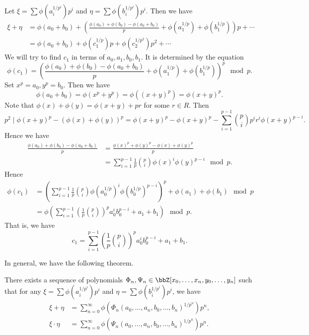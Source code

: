 \begin{example}
	Let $\xi = \sum \phi(a_i^{1/p^i})p^i$ and $\eta = \sum \phi(b_i^{1/p^i})p^i$.
	Then we have
	\begin{align*}
		\xi + \eta & = \phi(a_0 + b_0) + \left( \frac{\phi(a_0) + \phi(b_0) - \phi(a_0 + b_0)}{p} + \phi(a_1^{1/p}) + \phi(b_1^{1/p}) \right)p + \cdots \\
		           & = \phi(a_0 + b_0) + \phi(c_1^{1/p}) p + \phi(c_2^{1/p^2}) p^2 + \cdots
	\end{align*}
	We will try to find $c_1$ in terms of $a_0, a_1, b_0, b_1$.
	It is determined by the equation
	\[ \phi(c_1) = \left( \frac{\phi(a_0) + \phi(b_0) - \phi(a_0 + b_0)}{p} + \phi(a_1^{1/p}) + \phi(b_1^{1/p}) \right)^p \mod p. \]
	Set $x^p = a_0, y^p = b_0$.
	Then we have
	\[ \phi(a_0+b_0) = \phi(x^p + y^p) = \phi((x+y)^p) = \phi(x+y)^p. \]
	Note that $\phi(x) +\phi(y) = \phi(x + y) + p r$ for some $r \in R$.
	Then
	\[ p^2 \mid \phi(x+y)^p - (\phi(x) + \phi(y))^p = \phi(x+y)^p - \phi(x+y)^p - \sum_{i=1}^{p-1} \binom{p}{i} p^i r^i \phi(x+y)^{p-i}. \]
	Hence we have
	\begin{align*}
		\frac{\phi(a_0) + \phi(b_0) - \phi(a_0 + b_0)}{p} & = \frac{\phi(x)^p + \phi(y)^p - \phi(x)+\phi(y)^p}{p}                       \\
		                                                  & = \sum_{i=1}^{p-1} \frac{1}{p} \binom{p}{i} \phi(x)^i \phi(y)^{p-i} \mod p.
	\end{align*}
	Hence
	\begin{align*}
		\phi(c_1) & = \left( \sum_{i=1}^{p-1} \frac{1}{p} \binom{p}{i} \phi(a_0^{1/p})^i \phi(b_0^{1/p})^{p-i} \right)^p + \phi(a_1) + \phi(b_1) \mod p \\
		          & = \phi\left( \sum_{i=1}^{p-1} \left( \frac{1}{p} \binom{p}{i}\right)^p a_0^i b_0^{p-i} + a_1 + b_1 \right) \mod p.
	\end{align*}
	That is, we have
	\[ c_1 = \sum_{i=1}^{p-1} \left( \frac{1}{p} \binom{p}{i}\right)^p a_0^i b_0^{p-i} + a_1 + b_1. \]
\end{example}

In general, we have the following theorem.
\begin{theorem}
	There exists a sequence of polynomials $\Phi_n, \Psi_n \in \bbZ[x_0, \ldots, x_n, y_0, \ldots, y_n]$ such that for any $\xi = \sum \phi(a_i^{1/p^i})p^i$ and $\eta = \sum \phi(b_i^{1/p^i})p^i$, we have
	\begin{align*}
		\xi + \eta     & = \sum_{n=0}^\infty \phi(\Phi_n(a_0, \ldots, a_n, b_0, \ldots, b_n)^{1/p^n})p^n, \\
		\xi \cdot \eta & = \sum_{n=0}^\infty \phi(\Psi_n(a_0, \ldots, a_n, b_0, \ldots, b_n)^{1/p^n})p^n.
	\end{align*}
\end{theorem}

